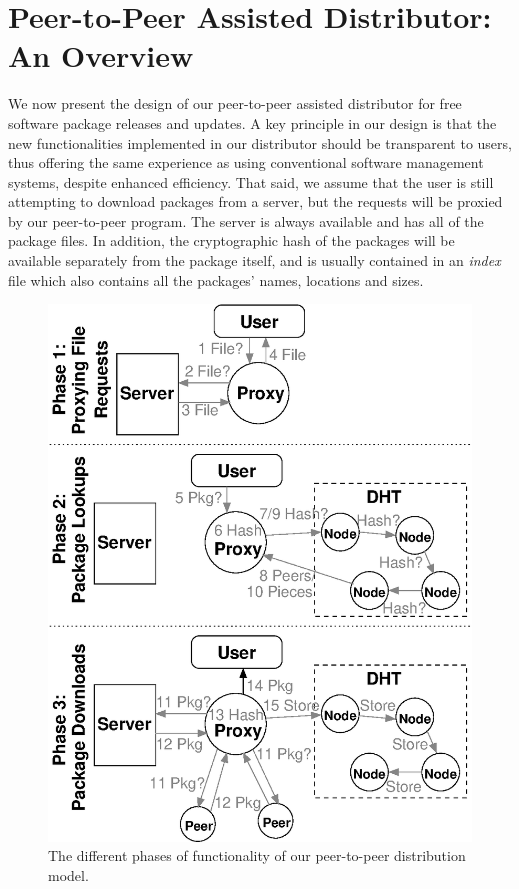 \documentclass[conference]{IEEEtran}
\begin{document}
\section{Peer-to-Peer Assisted Distributor: An Overview}
\label{opportunity}

We now present the design of our peer-to-peer assisted distributor for free software package releases and
updates. A key principle in our design is that the new functionalities implemented in our distributor should be transparent to users,
thus offering the same experience as using conventional software management systems, despite enhanced efficiency.
That said, we assume that the user is still attempting to download packages from a
server, but the requests will be proxied by our peer-to-peer program. The server is always available and has all of the package files.
In addition, the cryptographic hash of the packages will be available
separately from the package itself, and is usually contained in an
\emph{index} file which also contains all the packages' names,
locations and sizes.

\begin{figure}
\centering
\includegraphics[width=\columnwidth]{model_simple.eps}
\caption{The different phases of functionality of our peer-to-peer distribution model.}
\label{model}
\end{figure}
\end{document}
